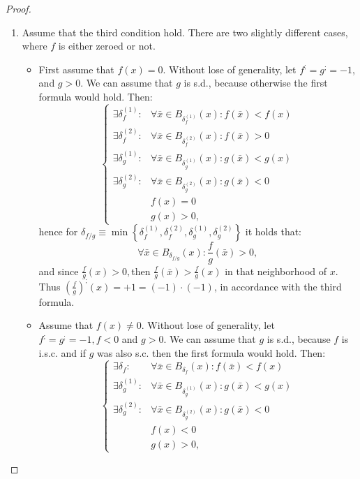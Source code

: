 \documentclass[11pt]{book}
\begin{document}
\begin{proof}
\begin{enumerate}
\item Assume that the third condition hold. There are two slightly different cases, where $f$ is either zeroed or not.
\begin{itemize}
\item First assume that $f\left(x\right)=0$. Without lose of generality, let $f^{;}=g^{;}=-1$, and $g>0$. We can assume that $g$ is s.d., because otherwise the first formula would hold. Then:
$$\begin{cases}\exists\delta_{f}^{\left(1\right)}: & \forall\bar{x}\in B_{\delta_{f}^{\left(1\right)}}\left(x\right):f\left(\bar{x}\right)< f\left(x\right)\\ \exists\delta_{f}^{\left(2\right)}: & \forall\bar{x}\in B_{\delta_{f}^{\left(2\right)}}\left(x\right):f\left(\bar{x}\right)>0\\\exists\delta_{g}^{\left(1\right)}: & \forall\bar{x}\in B_{\delta_{g}^{\left(1\right)}}\left(x\right):g\left(\bar{x}\right)< g\left(x\right)\\\exists\delta_{g}^{\left(2\right)}: & \forall\bar{x}\in B_{\delta_{g}^{\left(2\right)}}\left(x\right):g\left(\bar{x}\right)<0\\ & f\left(x\right)=0\\ & g\left(x\right)>0,\end{cases}$$
hence for $\delta_{f/g}\equiv\min\left\{ \delta_{f}^{\left(1\right)},\delta_{f}^{\left(2\right)},\delta_{g}^{\left(1\right)},\delta_{g}^{\left(2\right)}\right\}$ it holds that:
$$\forall\bar{x}\in B_{\delta_{f/g}}\left(x\right):\frac{f}{g}\left(\bar{x}\right)>0,$$
and since $\frac{f}{g}\left(x\right)>0,$then $\frac{f}{g}\left(\bar{x}\right)>\frac{f}{g}\left(x\right)$ in that neighborhood of $x$. Thus $\left(\frac{f}{g}\right)^{;}\left(x\right)=+1=\left(-1\right)\cdot\left(-1\right)$, in accordance with the third formula.
\item Assume that $f\left(x\right)\neq0$. Without lose of generality, let $f^{;}=g^{;}=-1,f<0$ and $g>0$. We can assume that $g$ is s.d., because $f$ is i.s.c. and if $g$ was also s.c. then the first formula would hold. Then:
$$\begin{cases}\exists\delta_{f}: & \forall\bar{x}\in B_{\delta_{f}}\left(x\right):f\left(\bar{x}\right)< f\left(x\right)\\\exists\delta_{g}^{\left(1\right)}: & \forall\bar{x}\in B_{\delta_{g}^{\left(1\right)}}\left(x\right):g\left(\bar{x}\right)< g\left(x\right)\\\exists\delta_{g}^{\left(2\right)}: & \forall\bar{x}\in B_{\delta_{g}^{\left(2\right)}}\left(x\right):g\left(\bar{x}\right)<0\\& f\left(x\right)<0\\ & g\left(x\right)>0,\end{cases}$$

\end{itemize}
\end{enumerate}
\end{proof}
\end{document}
